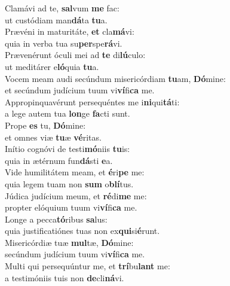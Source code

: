 \evenverse Clamávi ad te, \textbf{sal}vum \textbf{me} fac:~\*\\
\evenverse ut custódiam man\textbf{dá}ta \textbf{tu}a.\\
\oddverse Prævéni in maturitáte, \textbf{et} cla\textbf{má}vi:~\*\\
\oddverse quia in verba tua su\textbf{per}spe\textbf{rá}vi.\\
\evenverse Prævenérunt óculi mei ad \textbf{te} di\textbf{lú}culo:~\*\\
\evenverse ut meditárer e\textbf{ló}quia \textbf{tu}a.\\
\oddverse Vocem meam audi secúndum misericórdiam \textbf{tu}am, \textbf{Dó}mine:~\*\\
\oddverse et secúndum judícium tuum vi\textbf{ví}fi\textbf{ca} me.\\
\evenverse Appropinquavérunt persequéntes me i\textbf{ni}qui\textbf{tá}ti:~\*\\
\evenverse a lege autem tua \textbf{lon}ge \textbf{fa}cti sunt.\\
\oddverse Prope \textbf{es} tu, \textbf{Dó}mine:~\*\\
\oddverse et omnes viæ \textbf{tu}æ \textbf{vé}ritas.\\
\evenverse Inítio cognóvi de testi\textbf{mó}niis \textbf{tu}is:~\*\\
\evenverse quia in ætérnum fun\textbf{dá}sti \textbf{e}a.\\
\oddverse Vide humilitátem meam, et \textbf{é}ri\textbf{pe} me:~\*\\
\oddverse quia legem tuam non \textbf{sum} o\textbf{blí}tus.\\
\evenverse Júdica judícium meum, et \textbf{ré}di\textbf{me} me:~\*\\
\evenverse propter elóquium tuum vi\textbf{ví}fi\textbf{ca} me.\\
\oddverse Longe a pecca\textbf{tó}ribus \textbf{sa}lus:~\*\\
\oddverse quia justificatiónes tuas non ex\textbf{qui}si\textbf{é}runt.\\
\evenverse Misericórdiæ tuæ \textbf{mul}tæ, \textbf{Dó}mine:~\*\\
\evenverse secúndum judícium tuum vi\textbf{ví}fi\textbf{ca} me.\\
\oddverse Multi qui persequúntur me, et \textbf{trí}bu\textbf{lant} me:~\*\\
\oddverse a testimóniis tuis non \textbf{de}cli\textbf{ná}vi.\\
